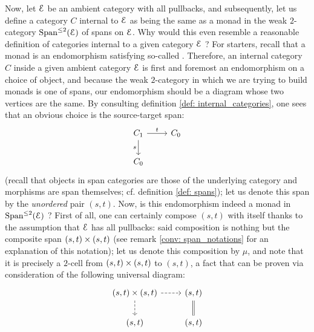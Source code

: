 \begin{remark}
                        Now, let $\E$ be an ambient category with all pullbacks, and subsequently, let us define a category $C$ internal to $\E$ as being the same as a monad in the weak $2$-category $\Span^{\leq 2}(\E)$ of spans on $\E$. Why would this even resemble a reasonable definition of categories internal to a given category $\E$ ? For starters, recall that a monad is an endomorphism satisfying so-called . Therefore, an internal category $C$ inside a given ambient category $\E$ is first and foremost an endomorphism on a choice of object, and because the weak $2$-category in which we are trying to build monads is one of spans, our endomorphism should be a  diagram whose two  vertices are the same. By consulting definition \ref{def: internal_categories}, one sees that an obvious choice is the source-target span:
                            $$
                                \begin{tikzcd}
                                	{C_1} & {C_0} \\
                                	{C_0}
                                	\arrow["s"', from=1-1, to=2-1]
                                	\arrow["t", from=1-1, to=1-2]
                                \end{tikzcd}
                            $$
                        (recall that objects in span categories are those of the underlying category and morphisms are span themselves; cf. definition \ref{def: spans}); let us denote this span by the \textit{unordered} pair $(s, t)$. Now, is this endomorphism indeed a monad in $\Span^{\leq 2}(\E)$ ? First of all, one can certainly compose $(s, t)$ with itself thanks to the assumption that $\E$ has all pullbacks: said composition is nothing but the composite span $(s, t) \x (s, t)$ (see remark \ref{conv: span_notations} for an explanation of this notation); let us denote this composition by $\mu$, and note that it is precisely a $2$-cell from $(s, t) \x (s, t)$ to $(s, t)$, a fact that can be proven via consideration of the following universal diagram:
                            $$
                                \begin{tikzcd}
                                	{(s, t) \x (s, t)} & {(s, t)} \\
                                	{(s, t)} & {(s, t)}
                                	\arrow[dashed, from=1-1, to=2-1]
                                	\arrow[dashed, from=1-1, to=1-2]
                                	\arrow[Rightarrow, no head, from=1-2, to=2-2]

\end{tikzcd}$$
\end{remark}
